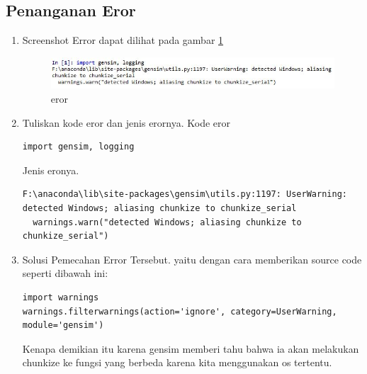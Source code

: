 \subsection{Penanganan Eror}
\begin{enumerate}
\item Screenshot Error dapat dilihat pada gambar \ref{c5_31}
\begin{figure}[!htbp]
\centerline{\includegraphics[width=1\textwidth]{figures/c5p/error.JPG}}
\caption{eror}
\label{c5_31}
\end{figure}
\item Tuliskan kode eror dan jenis erornya.
\subitem Kode eror
\begin{verbatim}
import gensim, logging
\end{verbatim}
\subitem Jenis eronya.
\begin{verbatim}
F:\anaconda\lib\site-packages\gensim\utils.py:1197: UserWarning: detected Windows; aliasing chunkize to chunkize_serial
  warnings.warn("detected Windows; aliasing chunkize to chunkize_serial")
\end{verbatim}
\item Solusi Pemecahan Error Tersebut.
\subitem yaitu dengan cara memberikan source code seperti dibawah ini:
\begin{verbatim}
import warnings
warnings.filterwarnings(action='ignore', category=UserWarning, module='gensim')
\end{verbatim}
\subitem Kenapa demikian itu karena gensim memberi tahu bahwa ia akan melakukan chunkize ke fungsi yang berbeda karena kita menggunakan os tertentu.
\end{enumerate}
